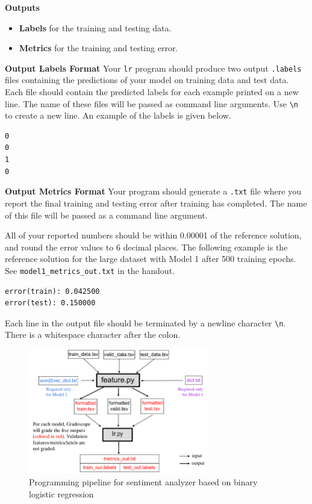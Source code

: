 \documentclass[11pt,addpoints,answers]{exam}
\begin{document}
{\bf Outputs }
\begin{itemize}
    \item \textbf{Labels} for the training and testing data.
    \item \textbf{Metrics} for the training and testing error.
\end{itemize}

{\bf Output Labels Format }
Your \lstinline{lr} program should produce two output \texttt{.labels} files containing the predictions of your model on training data and test data. Each file should contain the predicted labels for each example printed on a new line. The name of these files will be passed as command line arguments. Use \lstinline{\n} to create a new line. An example of the labels is given below.

\begin{lstlisting}
0
0
1
0
\end{lstlisting}

{\bf Output Metrics Format }
Your program should generate a \texttt{.txt} file where you report the final training and testing error after training has completed. The name of this file will be passed as a command line argument.

All of your reported numbers should be within 0.00001 of the reference solution, and round the error values to 6 decimal places. The following example is the reference solution for the large dataset with Model 1 after 500 training epochs. See \texttt{model1\_metrics\_out.txt} in the handout.

\begin{lstlisting}
error(train): 0.042500
error(test): 0.150000
\end{lstlisting}

Each line in the output file should be terminated by a newline character \lstinline{\n}. There is a whitespace character after the colon.

\begin{figure}[H]
        \centering
        \includegraphics[width = 0.7\textwidth]{Pipeline_v3.png}
        \caption{Programming pipeline for sentiment analyzer based on binary logistic regression}
        \label{pipeline}
\end{figure}
\end{document}
